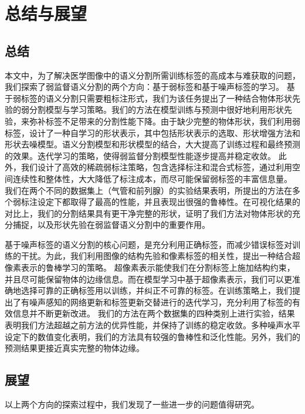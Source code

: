 \chapter{总结与展望}

\section{总结}
本文中，为了解决医学图像中的语义分割所需训练标签的高成本与难获取的问题，我们探索了弱监督语义分割的两个方向：基于弱标签和基于噪声标签的学习。
基于弱标签的语义分割只需要粗标注形式，我们为该任务提出了一种结合物体形状先验的弱分割模型与学习策略。我们的方法在模型训练与预测中很好地利用形状先验，来弥补标签不足带来的分割性能下降。由于缺少完整的物体形状，我们利用弱标签，设计了一种自学习的形状表示，其中包括形状表示的选取、形状增强方法和形状去噪模型。语义分割模型和形状模型的结合，大大提高了训练过程和最终预测的效果。迭代学习的策略，使得弱监督分割模型性能逐步提高并稳定收敛。
此外，我们设计了高效的稀疏弱标注策略，包含选择标注和混合式标签，通过利用空间连续性和整体性，大大降低了标注成本，而尽可能保留弱标签的丰富信息量。
我们在两个不同的数据集上（气管和前列腺）的实验结果表明，所提出的方法在多个弱标注设定下都取得了最高的性能，并且表现出很强的鲁棒性。在可视化结果的对比上，我们的分割结果具有更干净完整的形状，证明了我们方法对物体形状的充分捕捉，以及形状先验在弱监督语义分割中的重要作用。

基于噪声标签的语义分割的核心问题，是充分利用正确标签，而减少错误标签对训练的干扰。为此，我们利用图像的结构先验和像素标签的相关性，提出一种结合超像素表示的鲁棒学习的策略。
超像素表示能使我们在分割标签上施加结构约束，并且尽可能保留物体的边缘信息。而在模型学习中基于超像素表示，我们可以更准确地选择可靠的正确标签用以训练，并纠正不可靠的标签。在训练策略上，我们提出了有噪声感知的网络更新和标签更新交替进行的迭代学习，充分利用了标签的有效信息并不断更新改进。
我们的方法在两个数据集的四种类别上进行实验，结果表明我们方法超越之前方法的优异性能，并保持了训练的稳定收敛。多种噪声水平设定下的数值变化表明，我们的方法具有较强的鲁棒性和泛化性能。另外，我们的预测结果更接近真实完整的物体边缘。

\section{展望}
以上两个方向的探索过程中，我们发现了一些进一步的问题值得研究。

